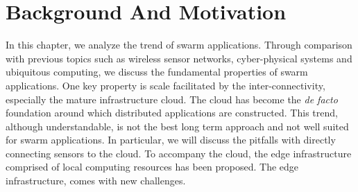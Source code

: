 \documentclass[thesis.tex]{subfiles}
\begin{document}
\chapter{Background And Motivation}
\label{cha:background}

In this chapter, we analyze the trend of swarm applications. Through comparison
with previous topics such as wireless sensor networks, cyber-physical systems
and ubiquitous computing, we discuss the fundamental properties of swarm
applications. One key property is scale facilitated by the inter-connectivity,
especially the mature infrastructure cloud. The cloud has become the \textit{de
  facto} foundation around which distributed applications are constructed. This
trend, although understandable, is not the best long term approach and not well
suited for swarm applications. In particular, we will discuss the pitfalls with
directly connecting sensors to the cloud. To accompany the cloud, the edge
infrastructure comprised of local computing resources has been proposed. The
edge infrastructure, comes with new challenges.





\end{document}
